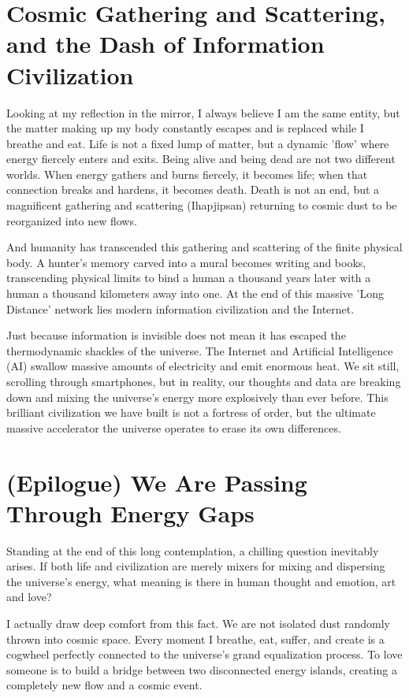 \documentclass[11pt,a4paper]{article}
\begin{document}
\section*{Cosmic Gathering and Scattering, and the Dash of Information Civilization}
Looking at my reflection in the mirror, I always believe I am the same entity, but the matter making up my body constantly escapes and is replaced while I breathe and eat. Life is not a fixed lump of matter, but a dynamic 'flow' where energy fiercely enters and exits. Being alive and being dead are not two different worlds. When energy gathers and burns fiercely, it becomes life; when that connection breaks and hardens, it becomes death. Death is not an end, but a magnificent gathering and scattering (Ihapjipsan) returning to cosmic dust to be reorganized into new flows.

And humanity has transcended this gathering and scattering of the finite physical body. A hunter's memory carved into a mural becomes writing and books, transcending physical limits to bind a human a thousand years later with a human a thousand kilometers away into one. At the end of this massive 'Long Distance' network lies modern information civilization and the Internet.

Just because information is invisible does not mean it has escaped the thermodynamic shackles of the universe. The Internet and Artificial Intelligence (AI) swallow massive amounts of electricity and emit enormous heat. We sit still, scrolling through smartphones, but in reality, our thoughts and data are breaking down and mixing the universe's energy more explosively than ever before. This brilliant civilization we have built is not a fortress of order, but the ultimate massive accelerator the universe operates to erase its own differences.

\section*{(Epilogue) We Are Passing Through Energy Gaps}
Standing at the end of this long contemplation, a chilling question inevitably arises. If both life and civilization are merely mixers for mixing and dispersing the universe's energy, what meaning is there in human thought and emotion, art and love?

I actually draw deep comfort from this fact. We are not isolated dust randomly thrown into cosmic space. Every moment I breathe, eat, suffer, and create is a cogwheel perfectly connected to the universe's grand equalization process. To love someone is to build a bridge between two disconnected energy islands, creating a completely new flow and a cosmic event.
\end{document}
